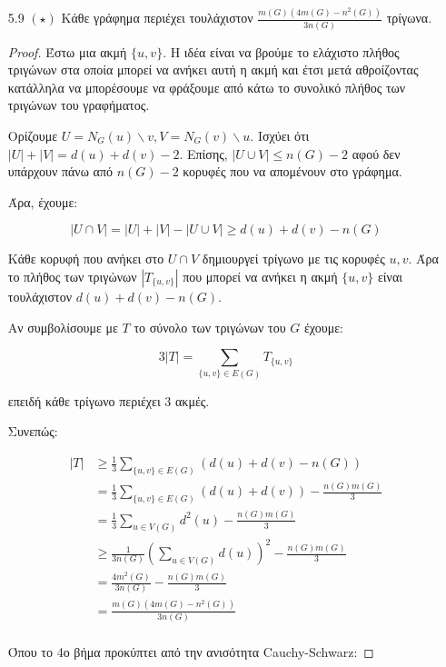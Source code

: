 \documentclass[a4paper, oneside, 11pt]{article}
\begin{document}
\begin{enumerate}
   \item[5.9 $(\star)$]
      Κάθε γράφημα περιέχει τουλάχιστον $\frac{m(G)(4m(G) - n^2(G))}{3n(G)}$
      τρίγωνα.

      \begin{proof}

      Έστω μια ακμή $\{u, v\}$. Η ιδέα είναι να βρούμε το ελάχιστο πλήθος
      τριγώνων στα οποία μπορεί να ανήκει αυτή η ακμή και έτσι μετά αθροίζοντας
      κατάλληλα να μπορέσουμε να φράξουμε από κάτω το συνολικό πλήθος των
      τριγώνων του γραφήματος.

      Ορίζουμε $U = N_G(u) \backslash v,
      V = N_G(v) \backslash u$. Ισχύει ότι $|U| + |V| = d(u) + d(v) - 2$.
      Επίσης, $|U \cup V| \leq n(G) - 2$ αφού δεν υπάρχουν πάνω από
      $n(G)-2$ κορυφές που να απομένουν στο γράφημα.

      Άρα, έχουμε:

      \[ |U \cap V| = |U| + |V| - |U \cup V| \geq d(u) + d(v) - n(G) \]

      Κάθε κορυφή που ανήκει στο $U \cap V$ δημιουργεί τρίγωνο με τις
      κορυφές $u, v$. Άρα το πλήθος των τριγώνων $|T_{\{u, v\}}|$ που μπορεί
      να ανήκει
      η ακμή $\{u, v\}$ είναι τουλάχιστον $d(u) + d(v) - n(G)$.

      Αν συμβολίσουμε με $T$ το σύνολο των τριγώνων του $G$ έχουμε:

      \[ 3|T| = \sum_{\{u, v\} \in E(G)} T_{\{u, v\}} \]

      επειδή κάθε τρίγωνο περιέχει 3 ακμές.

      Συνεπώς:

      \begin{align*}
         |T| &\geq \frac13 \sum_{\{u, v\} \in E(G)} ( d(u) + d(v) - n(G) )\\
             &= \frac13 \sum_{\{u, v\} \in E(G)} ( d(u) + d(v) ) -
                \frac{n(G)m(G)}3 \\
             &= \frac13 \sum_{u \in V(G)} d^2(u) - \frac{n(G)m(G)}3\\
             &\geq \frac1{3n(G)} \left( \sum_{u \in V(G)} d(u) \right)^2
                 - \frac{n(G)m(G)}3\\
             &= \frac{4m^2(G)}{3n(G)} - \frac{n(G)m(G)}3\\
             &= \frac{m(G)(4m(G) - n^2(G))}{3n(G)}\\
      \end{align*}

      Όπου το 4ο βήμα προκύπτει από την ανισότητα Cauchy-Schwarz:


\end{proof}
\end{enumerate}
\end{document}
